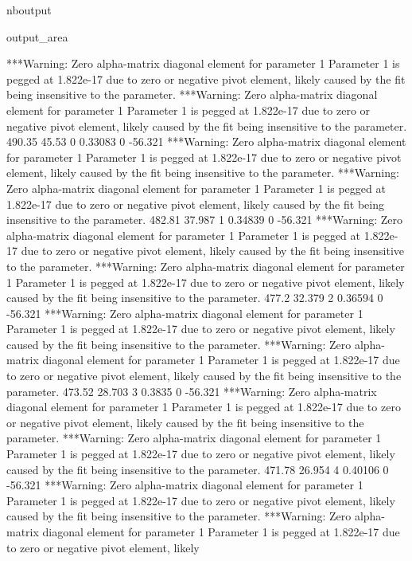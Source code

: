 \documentclass[letterpaper,10pt,english]{sphinxmanual}
\begin{document}
\begin{sphinxuseclass}{nboutput}
{\begin{sphinxuseclass}{output_area}
\begin{sphinxuseclass}{}
\begin{sphinxVerbatim}[commandchars=\\\{\}]
***Warning: Zero alpha-matrix diagonal element for parameter 1
 Parameter 1 is pegged at 1.822e-17 due to zero or negative pivot element, likely
 caused by the fit being insensitive to the parameter.
***Warning: Zero alpha-matrix diagonal element for parameter 1
 Parameter 1 is pegged at 1.822e-17 due to zero or negative pivot element, likely
 caused by the fit being insensitive to the parameter.
          490.35       45.53    0     0.33083    0     -56.321
***Warning: Zero alpha-matrix diagonal element for parameter 1
 Parameter 1 is pegged at 1.822e-17 due to zero or negative pivot element, likely
 caused by the fit being insensitive to the parameter.
***Warning: Zero alpha-matrix diagonal element for parameter 1
 Parameter 1 is pegged at 1.822e-17 due to zero or negative pivot element, likely
 caused by the fit being insensitive to the parameter.
          482.81      37.987    1     0.34839    0     -56.321
***Warning: Zero alpha-matrix diagonal element for parameter 1
 Parameter 1 is pegged at 1.822e-17 due to zero or negative pivot element, likely
 caused by the fit being insensitive to the parameter.
***Warning: Zero alpha-matrix diagonal element for parameter 1
 Parameter 1 is pegged at 1.822e-17 due to zero or negative pivot element, likely
 caused by the fit being insensitive to the parameter.
           477.2      32.379    2     0.36594    0     -56.321
***Warning: Zero alpha-matrix diagonal element for parameter 1
 Parameter 1 is pegged at 1.822e-17 due to zero or negative pivot element, likely
 caused by the fit being insensitive to the parameter.
***Warning: Zero alpha-matrix diagonal element for parameter 1
 Parameter 1 is pegged at 1.822e-17 due to zero or negative pivot element, likely
 caused by the fit being insensitive to the parameter.
          473.52      28.703    3      0.3835    0     -56.321
***Warning: Zero alpha-matrix diagonal element for parameter 1
 Parameter 1 is pegged at 1.822e-17 due to zero or negative pivot element, likely
 caused by the fit being insensitive to the parameter.
***Warning: Zero alpha-matrix diagonal element for parameter 1
 Parameter 1 is pegged at 1.822e-17 due to zero or negative pivot element, likely
 caused by the fit being insensitive to the parameter.
          471.78      26.954    4     0.40106    0     -56.321
***Warning: Zero alpha-matrix diagonal element for parameter 1
 Parameter 1 is pegged at 1.822e-17 due to zero or negative pivot element, likely
 caused by the fit being insensitive to the parameter.
***Warning: Zero alpha-matrix diagonal element for parameter 1
 Parameter 1 is pegged at 1.822e-17 due to zero or negative pivot element, likely

\end{sphinxVerbatim}
\end{sphinxuseclass}
\end{sphinxuseclass}}
\end{sphinxuseclass}
\end{document}
